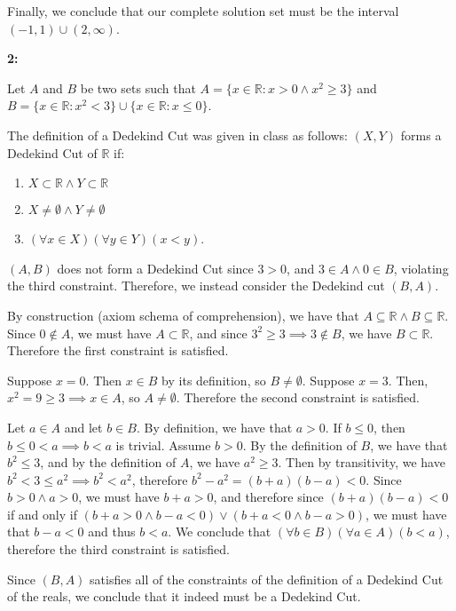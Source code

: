 \documentclass{article}
\newcommand{\reals}{\mathbb{R}}
\begin{document}
Finally, we conclude that our complete solution set
must be the interval $(-1,1) \cup (2, \infty)$.

\medskip
\textbf{2:}

Let $A$ and $B$ be two sets such that
$A = \{x \in \reals: x > 0 \land x^2 \geq 3\}$
and $B = \{x \in \reals: x^2 < 3\} \cup \{x \in \reals: x \le 0\}$.

The definition of a Dedekind Cut was given in class as follows:
$(X,Y)$ forms a Dedekind Cut of $\reals$ if:
\begin{enumerate}
	\item
	$X \subset \reals \land Y \subset \reals$
	\item
	$X \neq \emptyset \land Y \neq \emptyset$
	\item
	$(\forall x \in X)(\forall y \in Y)(x < y)$.
\end{enumerate}

\medskip
$(A,B)$ does not form a Dedekind Cut since $3 > 0$, and $3 \in A \land 0 \in B$,
violating the third constraint. Therefore, we instead consider the Dedekind cut $(B,A)$.

By construction (axiom schema of comprehension), we have that $A \subseteq \reals \land B \subseteq \reals$.
Since $0 \not\in A$, we must have $A \subset \reals$,
and since $3^2 \geq 3 \implies 3 \not\in B$, we have $B \subset \reals$.
Therefore the first constraint is satisfied.

Suppose $x = 0$. Then $x \in B$ by its definition, so $B \neq \emptyset$.
Suppose $x = 3$. Then, $x^2 = 9  \geq 3 \implies x \in A$, so $A \neq \emptyset$.
Therefore the second constraint is satisfied.

Let $a \in A$ and let $b \in B$.
By definition, we have that $a > 0$.
If $b \leq 0$, then $b \leq 0 < a \implies b < a$ is trivial.
Assume $b > 0$. By the definition of $B$, we have that $b^2 \leq 3$,
and by the definition of $A$, we have $a^2 \geq 3$.
Then by transitivity, we have $b^2 < 3 \le a^2 \implies b^2 < a^2$,
therefore $b^2 - a^2 = (b+a)(b-a) < 0$.
Since $b > 0 \land a > 0$, we must have $b + a > 0$,
and therefore since $(b+a)(b-a) < 0$ if and only if
$(b+a > 0 \land b-a < 0) \lor (b + a < 0 \land b - a > 0)$,
we must have that $b-a < 0$ and thus $b < a$.
We conclude that $(\forall b \in B)(\forall a \in A)(b < a)$,
therefore the third constraint is satisfied.

Since $(B,A)$ satisfies all of the constraints of the definition
of a Dedekind Cut of the reals, we conclude that it indeed must be a Dedekind Cut.
\end{document}

